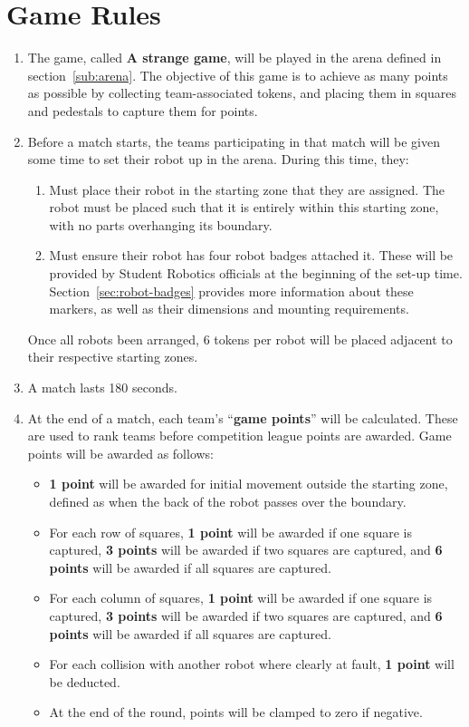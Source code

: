 \section {Game Rules}
\label{game-rules}

\begin{enumerate}
\item The game, called \textbf{A strange game}, will be played in the arena defined in section~\ref{sub:arena}.
      The objective of this game is to achieve as many points as possible by collecting team-associated tokens,
       and placing them in squares and pedestals to capture them for points.

\item Before a match starts, the teams participating in that match will be given some time to set their robot up in the arena.
      During this time, they:
\begin{enumerate}
  \item Must place their robot in the starting zone that they are assigned.
        The robot must be placed such that it is entirely within this starting zone, with no parts overhanging its boundary.

  \item Must ensure their robot has four robot badges attached it.
        These will be provided by Student Robotics officials at the beginning of the set-up time.
        Section~\ref{sec:robot-badges} provides more information about these markers, as well as their dimensions and mounting requirements.
\end{enumerate}
      Once all robots been arranged, 6 tokens per robot will be placed adjacent to their respective starting zones.

\item A match lasts 180 seconds.

\item At the end of a match, each team's ``\textbf{game points}'' will be calculated.
      These are used to rank teams before competition league points are awarded.
      Game points will be awarded as follows:
\begin{itemize}
  \item \textbf{1 point} will be awarded for initial movement outside the starting zone, defined as when the back of the robot passes over the boundary.
  \item For each row of squares, \textbf{1 point} will be awarded if one square is captured, \textbf{3 points} will be awarded if two squares are captured, and \textbf{6 points} will be awarded if all squares are captured.
  \item For each column of squares, \textbf{1 point} will be awarded if one square is captured, \textbf{3 points} will be awarded if two squares are captured, and \textbf{6 points} will be awarded if all squares are captured.
  \item For each collision with another robot where clearly at fault, \textbf{1 point} will be deducted.
  \item At the end of the round, points will be clamped to zero if negative.
\end{itemize}


\end{enumerate}
